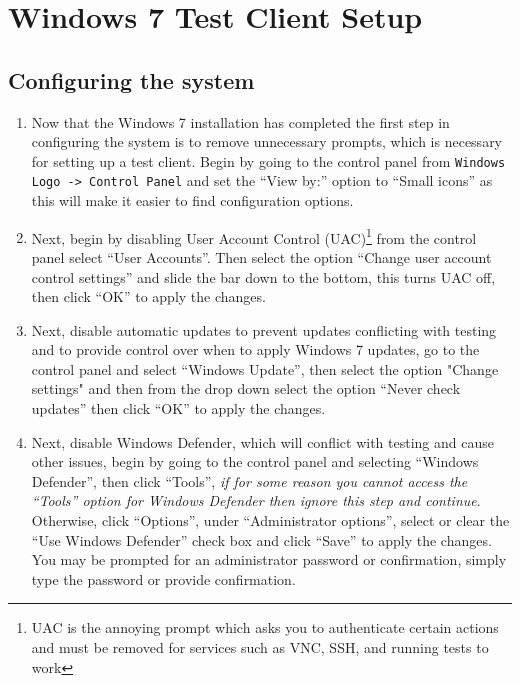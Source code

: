 \section{Windows 7 Test Client Setup}
\subsection{Configuring the system}
\label{sec:windows7config}
\begin{enumerate}
\item	Now that the Windows 7 installation has completed the first step in configuring the system is to remove unnecessary prompts,
		which is necessary for setting up a test client. Begin by going to the control panel from \verb|Windows Logo -> Control Panel|
		and set the ``View by:'' option to ``Small icons'' as this will make it easier to find configuration options.
		
\item	Next, begin by disabling User Account Control (UAC)\footnote{UAC is the annoying prompt which asks you to authenticate certain
		actions and must be removed for services such as VNC, SSH, and running tests to work} from the control panel select ``User Accounts''.
		Then select the option ``Change user account control settings'' and slide the bar down to the bottom, this turns UAC off, then click
		``OK'' to apply the changes.
		
\item	Next, disable automatic updates to prevent updates conflicting with testing and to provide control over when to apply Windows 7 updates,
		go to the control panel and select ``Windows Update'', then select the option "Change settings" and then from the drop down select the 
		option ``Never check updates'' then click ``OK'' to apply the changes.
		
\item	Next, disable Windows Defender, which will conflict with testing and cause other issues, begin by going to the control panel and 
		selecting ``Windows Defender'', then click ``Tools'', \emph{if for some reason you cannot access the ``Tools'' option for
		Windows Defender then ignore this step and continue}. Otherwise, click ``Options'', under ``Administrator options'', select or clear 
		the ``Use Windows Defender'' check box and click ``Save'' to apply the changes. You may be prompted for an administrator password or 	
		confirmation, simply type the password or provide confirmation.
		

\end{enumerate}
